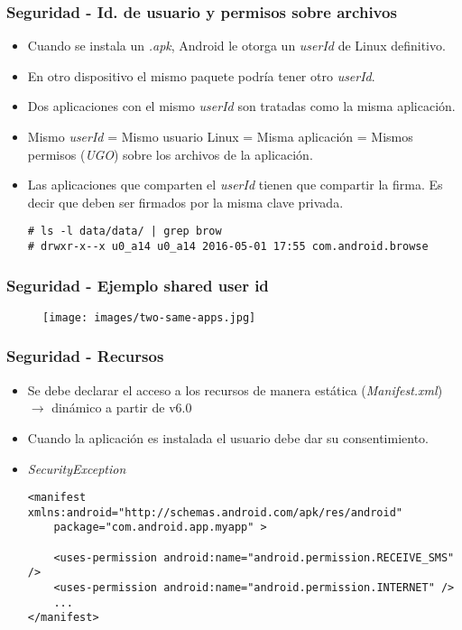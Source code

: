 \begin{frame}[fragile]
  \frametitle{Seguridad - Id. de usuario y permisos sobre archivos}
  \begin{itemize}
    \item Cuando se instala un \textit{.apk}, Android le otorga un \textit{userId} de Linux definitivo.
    
    \item En otro dispositivo el mismo paquete podría tener otro \textit{userId}.
    
    \item Dos aplicaciones con el mismo \textit{userId} son tratadas como la misma aplicación.
    
    \item Mismo \textit{userId} = Mismo usuario Linux = Misma aplicación = Mismos permisos (\textit{UGO}) sobre los archivos de la aplicación.
    
    \item Las aplicaciones que comparten el \textit{userId} tienen que compartir la firma. Es decir que deben ser firmados por la misma clave privada.

    \begin{lstlisting}
# ls -l data/data/ | grep brow
# drwxr-x--x u0_a14 u0_a14 2016-05-01 17:55 com.android.browse
    \end{lstlisting}
  \end{itemize}
\end{frame}

\begin{frame}
  \frametitle{Seguridad - Ejemplo shared user id}
  \begin{figure}
    \centering
    \texttt{[image: images/two-same-apps.jpg]}
  \end{figure}
\end{frame}

\begin{frame}[fragile]
  \frametitle{Seguridad - Recursos}
  \begin{itemize}
    \item Se debe declarar el acceso a los recursos de manera estática (\textit{Manifest.xml}) $\rightarrow$ dinámico a partir de v6.0
    
    \item Cuando la aplicación es instalada el usuario debe dar su consentimiento.
    
    \item \textit{SecurityException}
    \begin{lstlisting}
<manifest xmlns:android="http://schemas.android.com/apk/res/android"
    package="com.android.app.myapp" >

    <uses-permission android:name="android.permission.RECEIVE_SMS" />
    <uses-permission android:name="android.permission.INTERNET" />
    ...
</manifest>
    \end{lstlisting}    
  \end{itemize}
\end{frame}

